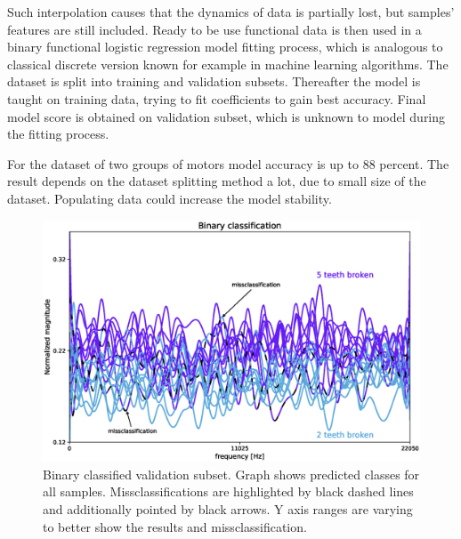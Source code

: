 \documentclass[energies,article,submit,pdftex,moreauthors]{Definitions/mdpi}
\begin{document}
Such interpolation causes that the dynamics of data is partially lost, but samples' features are still included. Ready to be use functional data is then used in a binary functional logistic regression model fitting process, which is analogous to classical discrete version known for example in machine learning algorithms. The dataset is split into training and validation subsets. Thereafter the model is taught on training data, trying to fit coefficients to gain best accuracy. Final model score is obtained on validation subset, which is unknown to model during the fitting process.

For the dataset of two groups of motors model accuracy is up to 88 percent. The result depends on the dataset splitting method a lot, due to small size of the dataset. Populating data could increase the model stability. 

\begin{figure}[H]
\includegraphics[width=\textwidth]{images/binary_classification}
\caption{Binary classified validation subset. Graph shows predicted classes for all samples. Missclassifications are highlighted by black dashed lines and additionally pointed by black arrows. Y axis ranges are varying to better show the results and missclassification.}
\end{figure}
\unskip
\vspace{5mm}
\end{document}
